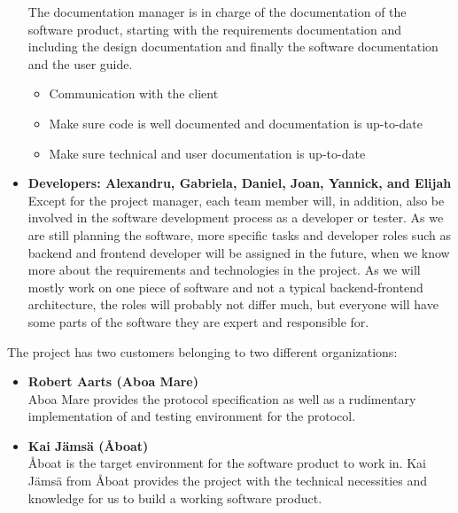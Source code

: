 \begin{itemize}
		The documentation manager is in charge of the documentation of the software product, starting with the requirements documentation and including the design documentation and finally the software documentation and the user guide.
		\begin{itemize}
			\item Communication with the client
			\item Make sure code is well documented and documentation is up-to-date
			\item Make sure technical and user documentation is up-to-date
		\end{itemize}
	\item \textbf{Developers: Alexandru, Gabriela,  Daniel,  Joan, Yannick, and Elijah} \\
		Except for the project manager, each team member will, in addition, also be involved in the software development process as a developer or tester. As we are still planning the software, more specific tasks and developer roles such as backend and frontend developer will be assigned in the future, when we know more about the requirements and technologies in the project. As we will mostly work on one piece of software and not a typical backend-frontend architecture, the roles will probably not differ much, but everyone will have some parts of the software they are expert and responsible for.
\end{itemize}

\noindent
The project has two customers belonging to two different organizations:

\begin{itemize}
	\item \textbf{Robert Aarts (Aboa Mare)} \\
		Aboa Mare provides the protocol specification as well as a rudimentary implementation of and testing environment for the protocol.
	\item \textbf{Kai Jämsä (Åboat)} \\
		Åboat is the target environment for the software product to work in. Kai Jämsä from Åboat provides the project with the technical necessities and knowledge for us to build a working software product.
\end{itemize}